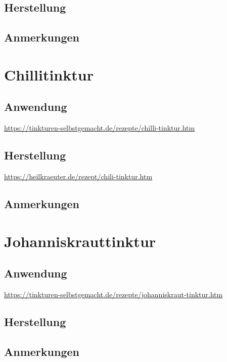 \subsection{Herstellung}

\subsection{Anmerkungen}





\section{Chillitinktur}

\subsection{Anwendung}

\cite{tinkturen}  \url{https://tinkturen-selbstgemacht.de/rezepte/chilli-tinktur.htm}

\subsection{Herstellung}

\cite{tinkturen}  \url{https://heilkraeuter.de/rezept/chili-tinktur.htm}

\subsection{Anmerkungen}






\section{Johanniskrauttinktur}

\subsection{Anwendung}

\cite{tinkturen}  \url{https://tinkturen-selbstgemacht.de/rezepte/johanniskraut-tinktur.htm}

\subsection{Herstellung}

\subsection{Anmerkungen}





